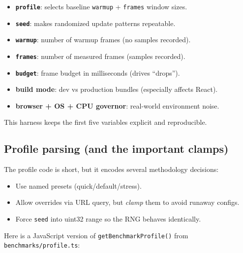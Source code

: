 \begin{itemize}
\item \textbf{\texttt{profile}}: selects baseline \texttt{warmup} + \texttt{frames} window sizes.
\item \textbf{\texttt{seed}}: makes randomized update patterns repeatable.
\item \textbf{\texttt{warmup}}: number of warmup frames (no samples recorded).
\item \textbf{\texttt{frames}}: number of measured frames (samples recorded).
\item \textbf{\texttt{budget}}: frame budget in milliseconds (drives ``drops'').
\item \textbf{build mode}: dev vs production bundles (especially affects React).
\item \textbf{browser + OS + CPU governor}: real-world environment noise.
\end{itemize}

This harness keeps the first five variables explicit and reproducible.

\subsection{Profile parsing (and the important clamps)}

The profile code is short, but it encodes several methodology decisions:

\begin{itemize}
\item Use named presets (quick/default/stress).
\item Allow overrides via URL query, but \emph{clamp} them to avoid runaway configs.
\item Force \texttt{seed} into uint32 range so the RNG behaves identically.
\end{itemize}

Here is a JavaScript version of \texttt{getBenchmarkProfile()} from \texttt{benchmarks/profile.ts}:

